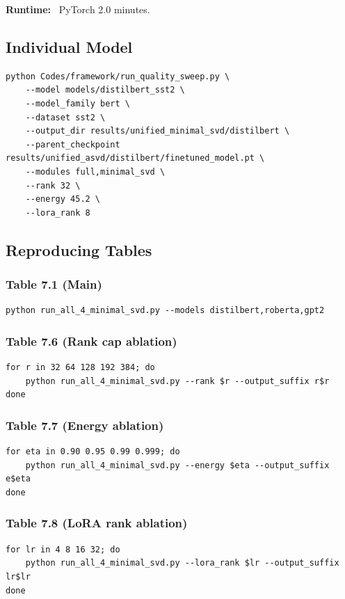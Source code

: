 \textbf{Runtime:} ~PyTorch 2.0 minutes.

\subsection{Individual Model}

\begin{lstlisting}
python Codes/framework/run_quality_sweep.py \
    --model models/distilbert_sst2 \
    --model_family bert \
    --dataset sst2 \
    --output_dir results/unified_minimal_svd/distilbert \
    --parent_checkpoint results/unified_asvd/distilbert/finetuned_model.pt \
    --modules full,minimal_svd \
    --rank 32 \
    --energy 45.2 \
    --lora_rank 8
\end{lstlisting}

\subsection{Reproducing Tables}

\subsubsection{Table 7.1 (Main)}
\begin{lstlisting}
python run_all_4_minimal_svd.py --models distilbert,roberta,gpt2
\end{lstlisting}

\subsubsection{Table 7.6 (Rank cap ablation)}
\begin{lstlisting}
for r in 32 64 128 192 384; do
    python run_all_4_minimal_svd.py --rank $r --output_suffix r$r
done
\end{lstlisting}

\subsubsection{Table 7.7 (Energy ablation)}
\begin{lstlisting}
for eta in 0.90 0.95 0.99 0.999; do
    python run_all_4_minimal_svd.py --energy $eta --output_suffix e$eta
done
\end{lstlisting}

\subsubsection{Table 7.8 (LoRA rank ablation)}
\begin{lstlisting}
for lr in 4 8 16 32; do
    python run_all_4_minimal_svd.py --lora_rank $lr --output_suffix lr$lr
done
\end{lstlisting}

